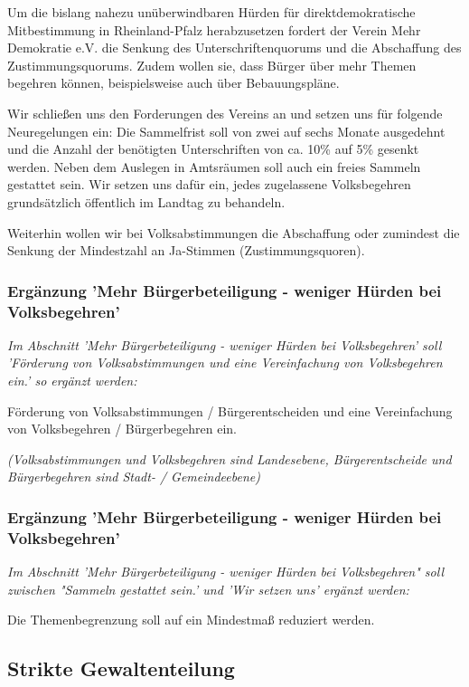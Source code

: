 Um die bislang nahezu unüberwindbaren Hürden für direktdemokratische Mitbestimmung in Rheinland-Pfalz herabzusetzen fordert der Verein Mehr Demokratie e.V. die Senkung des Unterschriftenquorums und die Abschaffung des Zustimmungsquorums. Zudem wollen sie, dass Bürger über mehr Themen begehren können, beispielsweise auch über Bebauungspläne.

Wir schließen uns den Forderungen des Vereins an und setzen uns für folgende Neuregelungen ein: Die Sammelfrist soll von zwei auf sechs Monate ausgedehnt und die Anzahl der benötigten Unterschriften von ca. 10\% auf 5\% gesenkt werden. Neben dem Auslegen in Amtsräumen soll auch ein freies Sammeln gestattet sein. Wir setzen uns dafür ein, jedes zugelassene Volksbegehren grundsätzlich öffentlich im Landtag zu behandeln.

Weiterhin wollen wir bei Volksabstimmungen die Abschaffung oder zumindest die Senkung der Mindestzahl an Ja-Stimmen (Zustimmungsquoren).
 

\subsubsection{Ergänzung 'Mehr Bürgerbeteiligung - weniger Hürden bei Volksbegehren'}
\abstimmung
\textit{Im Abschnitt 'Mehr Bürgerbeteiligung - weniger Hürden bei Volksbegehren' soll 'Förderung von Volksabstimmungen und eine Vereinfachung von Volksbegehren ein.' so ergänzt werden:}

Förderung von Volksabstimmungen / Bürgerentscheiden und eine Vereinfachung von Volksbegehren / Bürgerbegehren ein. 

\textit{(Volksabstimmungen und Volksbegehren sind Landesebene, Bürgerentscheide und Bürgerbegehren sind Stadt- / Gemeindeebene)}

\subsubsection{Ergänzung 'Mehr Bürgerbeteiligung - weniger Hürden bei Volksbegehren'}
\abstimmung
\textit{Im Abschnitt 'Mehr Bürgerbeteiligung - weniger Hürden bei Volksbegehren" soll zwischen "Sammeln gestattet sein.' und 'Wir setzen uns' ergänzt werden:}

Die Themenbegrenzung soll auf ein Mindestmaß reduziert werden.

 
\subsection*{Strikte Gewaltenteilung}

